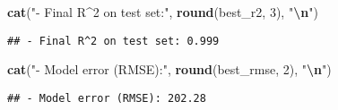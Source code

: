 \documentclass[
]{article}
\newenvironment{Shaded}{\begin{snugshade}}{\end{snugshade}}
\newcommand{\DecValTok}[1]{\textcolor[rgb]{0.00,0.00,0.81}{#1}}
\newcommand{\FunctionTok}[1]{\textcolor[rgb]{0.13,0.29,0.53}{\textbf{#1}}}
\newcommand{\NormalTok}[1]{#1}
\newcommand{\SpecialCharTok}[1]{\textcolor[rgb]{0.81,0.36,0.00}{\textbf{#1}}}
\newcommand{\StringTok}[1]{\textcolor[rgb]{0.31,0.60,0.02}{#1}}
\begin{document}
\begin{Shaded}
\begin{Highlighting}[]
\FunctionTok{cat}\NormalTok{(}\StringTok{"{-} Final R\^{}2 on test set:"}\NormalTok{, }\FunctionTok{round}\NormalTok{(best\_r2, }\DecValTok{3}\NormalTok{), }\StringTok{"}\SpecialCharTok{\textbackslash{}n}\StringTok{"}\NormalTok{)}
\end{Highlighting}
\end{Shaded}

\begin{verbatim}
## - Final R^2 on test set: 0.999
\end{verbatim}

\begin{Shaded}
\begin{Highlighting}[]
\FunctionTok{cat}\NormalTok{(}\StringTok{"{-} Model error (RMSE):"}\NormalTok{, }\FunctionTok{round}\NormalTok{(best\_rmse, }\DecValTok{2}\NormalTok{), }\StringTok{"}\SpecialCharTok{\textbackslash{}n}\StringTok{"}\NormalTok{)}
\end{Highlighting}
\end{Shaded}

\begin{verbatim}
## - Model error (RMSE): 202.28
\end{verbatim}
\end{document}
